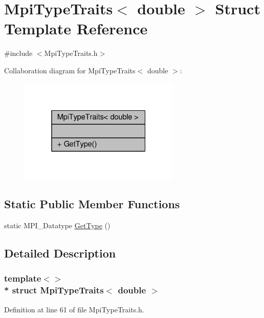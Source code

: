 \hypertarget{structMpiTypeTraits_3_01double_01_4}{}\section{Mpi\+Type\+Traits$<$ double $>$ Struct Template Reference}
\label{structMpiTypeTraits_3_01double_01_4}


{\ttfamily \#include $<$Mpi\+Type\+Traits.\+h$>$}



Collaboration diagram for Mpi\+Type\+Traits$<$ double $>$\+:\nopagebreak
\begin{figure}[H]
\begin{center}
\leavevmode
\includegraphics[width=217pt]{structMpiTypeTraits_3_01double_01_4__coll__graph}
\end{center}
\end{figure}
\subsection*{Static Public Member Functions}
\begin{DoxyCompactItemize}
\item 
static M\+P\+I\+\_\+\+Datatype \hyperlink{structMpiTypeTraits_3_01double_01_4_a9b02fb25885488ff22ef11ba1629ad98}{Get\+Type} ()
\end{DoxyCompactItemize}


\subsection{Detailed Description}
\subsubsection*{template$<$$>$\\*
struct Mpi\+Type\+Traits$<$ double $>$}



Definition at line 61 of file Mpi\+Type\+Traits.\+h.



